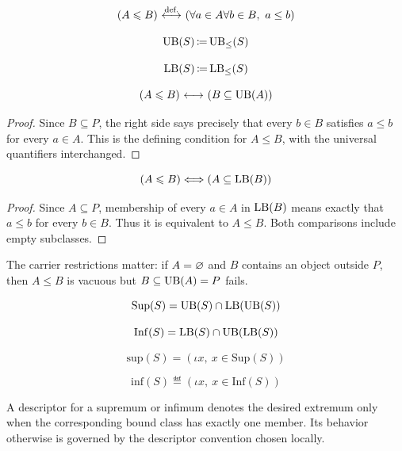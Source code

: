 \begin{definition}
\[
(A \leqslant B)
\ {\stackrel{{\textrm{def.}}}{\longleftrightarrow}}\ 
(\forall a\in A \forall b\in B,\ a\leq b)
\]
\end{definition}
\begin{definition}
\[
\mathrm{UB}(S) \,{\coloneqq}\, \mathrm{UB}_{\leq}(S)
\]
\end{definition}
\begin{definition}
\[
\mathrm{LB}(S) \,{\coloneqq}\, \mathrm{LB}_{\leq}(S)
\]
\end{definition}
\begin{theorem}
\[
(A\leqslant B)
{\ \longleftrightarrow\ }
(B\subseteq \mathrm{UB}(A))
\]
\end{theorem}
\begin{proof}
Since $B\subseteq P$, the right side says precisely that every $b\in B$
satisfies $a\leq b$ for every $a\in A$. This is the defining condition
for $A\leqslant B$, with the universal quantifiers interchanged.
\end{proof}
\begin{theorem}
\[
(A\leqslant B)
\Longleftrightarrow
(A\subseteq \mathrm{LB}(B))
\]
\end{theorem}
\begin{proof}
Since $A\subseteq P$, membership of every $a\in A$ in $\mathrm{LB}(B)$
means exactly that $a\leq b$ for every $b\in B$. Thus it is equivalent
to $A\leqslant B$. Both comparisons include empty subclasses.
\end{proof}
The carrier restrictions matter: if $A=\varnothing$ and $B$ contains
an object outside $P$, then $A\leqslant B$ is vacuous but
$B\subseteq\mathrm{UB}(A)=P$ fails.
\begin{definition}
\[
\mathrm{Sup}(S) = \mathrm{UB}(S)\cap \mathrm{LB}(\mathrm{UB}(S))
\]
\end{definition}
\begin{definition}
\[
\mathrm{Inf}(S) = \mathrm{LB}(S)\cap \mathrm{UB}(\mathrm{LB}(S))
\]
\end{definition}
\begin{definition}
\[
\mbox{sup}(S) = (\iota x,\ x\in \mathrm{Sup}(S))
\]
\end{definition}
\begin{definition}
\[
\mbox{inf}(S) \eqdef (\iota x,\ x\in \mathrm{Inf}(S))
\]
\end{definition}
A descriptor for a supremum or infimum denotes the desired extremum only
when the corresponding bound class has exactly one member. Its behavior
otherwise is governed by the descriptor convention chosen locally.

